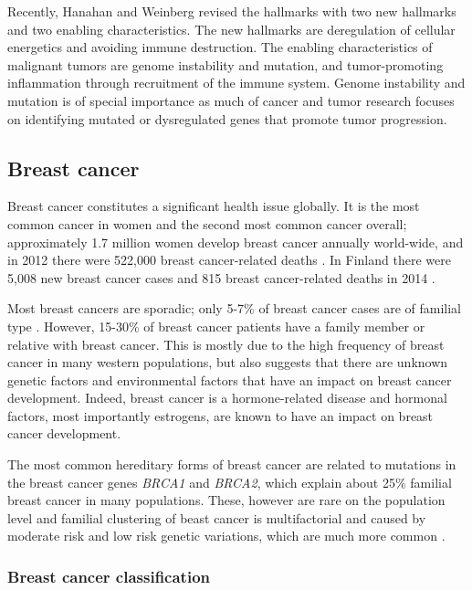 Recently, Hanahan and Weinberg \citep{Hanahan2011} revised the hallmarks with two new
hallmarks and two enabling characteristics. The new
hallmarks are deregulation of cellular energetics and avoiding immune
destruction. The enabling characteristics of malignant tumors are genome
instability and mutation, and tumor-promoting inflammation through recruitment
of the immune system. Genome instability and mutation is of special importance
as much of cancer and tumor research focuses on identifying mutated or
dysregulated genes that promote tumor progression.




\subsection{Breast cancer}\label{breast-cancer}

Breast cancer constitutes a significant health issue globally. It is the most
common cancer in women and the second most common cancer overall;
approximately 1.7 million women develop breast cancer annually world-wide, and
in 2012 there were 522,000 breast cancer-related deaths
\citep{Ferlay2015}. In Finland there were 5,008 new breast cancer cases
and 815 breast cancer-related deaths in 2014 \citep{Syoparekisteri}.

Most breast cancers are sporadic; only 5-7\% of breast cancer cases are of
familial type \citep{Melchor2013}. However, 15-30\% of breast cancer patients
have a family member or relative with breast cancer. This is
mostly due to the high frequency of breast cancer in many western populations,
but also suggests that there are unknown genetic factors and environmental
factors that have an impact on breast cancer development. Indeed, breast
cancer is a hormone-related disease and hormonal factors, most importantly estrogens,
are known to have an impact on breast cancer development.

The most common hereditary forms of breast cancer are related to mutations in
the breast cancer genes \emph{BRCA1} and \emph{BRCA2}, which explain about 25\% familial
breast cancer in many populations. These, however are rare on the population
level and familial clustering of beast cancer is multifactorial and caused by
moderate risk and low risk genetic variations, which are much more common
\citep{Melchor2013}.




\subsubsection{Breast cancer classification}\label{breast-cancer-classification}

